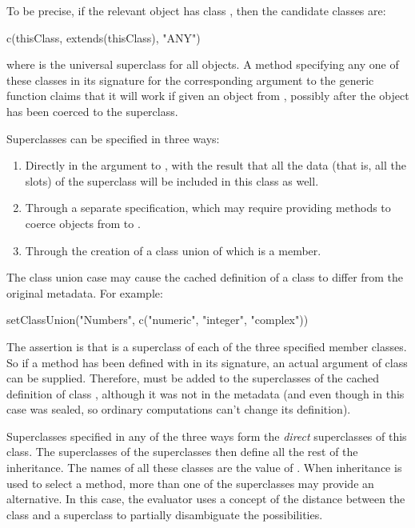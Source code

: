 \documentclass[11pt]{article}
\begin{document}
To be precise, if the relevant object has class , then the candidate classes are:
\begin{Example}
c(thisClass, extends(thisClass), "ANY")
\end{Example}
where  is the universal superclass for all objects.
A method specifying any one of these classes in its signature for the corresponding argument to the generic function claims that it will work if given an object from , possibly after the object has been coerced to the superclass.

Superclasses can be specified in three ways:
\begin{enumerate}
\item Directly in the  argument to , with the result that all the data (that is, all the slots) of the superclass will be included in this class as well.
\item  Through a separate  specification, which may require providing methods to coerce objects from  to .
\item Through the creation of a class union of which  is a member.
\end{enumerate}
The class union case may cause the cached definition of a class to differ from the original metadata.
For example:
\begin{Example}
setClassUnion("Numbers", c("numeric", "integer", "complex"))
\end{Example}
The assertion is that  is a superclass of each of the three specified member classes.
So if a method has been defined with  in its signature, an actual argument of class  can be supplied.
Therefore,  must be added to the superclasses of the cached definition of class , although it was not in the metadata (and even though in this case  was sealed, so ordinary computations can't change its definition).

Superclasses specified in any of the three ways form the \emph{direct} superclasses of this class.
The superclasses of the superclasses then define all the rest of the inheritance.
The names of all these classes are the value of .
When inheritance is used to select a method, more than one of the superclasses may provide an alternative.
In this case, the evaluator uses a concept of the distance between the class and a superclass to partially disambiguate the possibilities.
\end{document}
